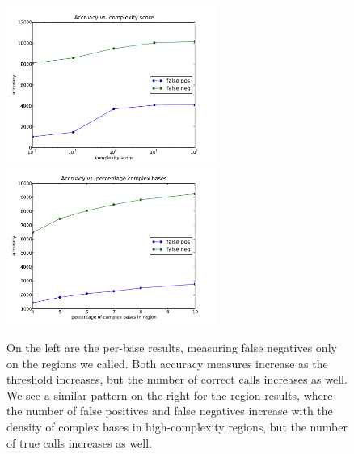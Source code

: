 \documentclass[12pt]{article}
\begin{document}
\begin{figure}[h!]
	\includegraphics[width=2.7in]{figs/base_accuracy_vs_thresh.pdf}
	\includegraphics[width=2.7in]{figs/region_accuracy_vs_thresh.pdf}
	\caption{On the left are the per-base results, measuring false negatives only on the regions we called. Both accuracy measures increase as the threshold increases, but the number of correct calls increases as well.  We see a similar pattern on the right for the region results, where the number of false positives and false negatives increase with the density of complex bases in high-complexity regions, but the number of true calls increases as well.}
	\end{figure}
\end{document}
